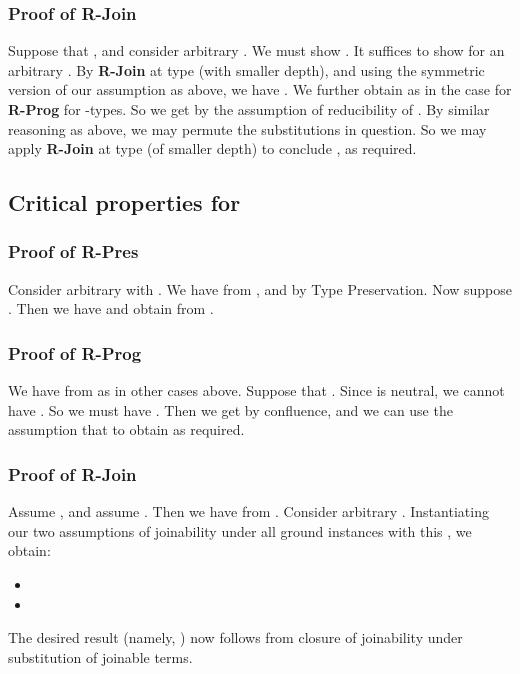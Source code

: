 \documentclass[copyright]{eptcs}
\begin{document}
\subsubsection{Proof of \textbf{R-Join}}

Suppose that , and consider arbitrary
.  We must show
.  It suffices to
show  for an arbitrary
.  By \textbf{R-Join} at type
 (with smaller depth), and using the symmetric version of our
assumption as above, we have .  We
further obtain  as in the case
for \textbf{R-Prog} for -types.  So we get
 by the assumption of
reducibility of .  By similar reasoning as above, we may permute
the substitutions in question.  So we may apply \textbf{R-Join} at
type  (of smaller depth) to conclude
, as required.

\subsection{Critical properties for }

\subsubsection{Proof of \textbf{R-Pres}}

Consider arbitrary  with .  We
have  from , and  by Type
Preservation.  Now suppose .  Then we have
 and obtain  from
.  

\subsubsection{Proof of \textbf{R-Prog}}

We have  from  as in other cases above.
Suppose that .  Since  is neutral, we cannot
have .  So we must have .  Then we get
 by confluence, and we can use the assumption that
 to obtain  as
required.

\subsubsection{Proof of \textbf{R-Join}}

Assume , and assume .  Then we
have  from .  Consider arbitrary
.  Instantiating our two assumptions of
joinability under all ground instances with this , we obtain:
\begin{itemize}
\item 
\item 
\end{itemize}
\noindent The desired result (namely, ) now follows from 
closure of joinability under substitution of joinable terms.
\end{document}
